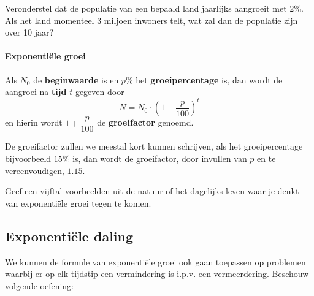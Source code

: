 \documentclass[12pt,twoside]{article}
\begin{document}
\begin{oefening}
Veronderstel dat de populatie van een bepaald land jaarlijks aangroeit met $2\%$. Als het land momenteel 3 miljoen inwoners telt, wat zal dan de populatie zijn over 10 jaar?
\end{oefening}

\paragraph*{Exponentiële groei}

\begin{mdframed}
Als $N_0$ de {\bf beginwaarde} is en $p\%$ het {\bf groeipercentage} is, dan wordt de aangroei na {\bf tijd} $t$ gegeven door
$$N=N_0\cdot\left(1+\dfrac{p}{100}\right)^t$$
en hierin wordt $1+\dfrac{p}{100}$ de {\bf groeifactor} genoemd.
\end{mdframed}

De groeifactor zullen we meestal kort kunnen schrijven, als het groeipercentage bijvoorbeeld $15\%$ is, dan wordt de groeifactor, door invullen van $p$ en te vereenvoudigen, $1.15$.

\begin{oefening}
Geef een vijftal voorbeelden uit de natuur of het dagelijks leven waar je denkt van exponentiële groei tegen te komen.
\end{oefening}

\subsection{Exponentiële daling}

We kunnen de formule van exponentiële groei ook gaan toepassen op problemen waarbij er op elk tijdstip een vermindering is i.p.v. een vermeerdering. Beschouw volgende oefening:
\end{document}
